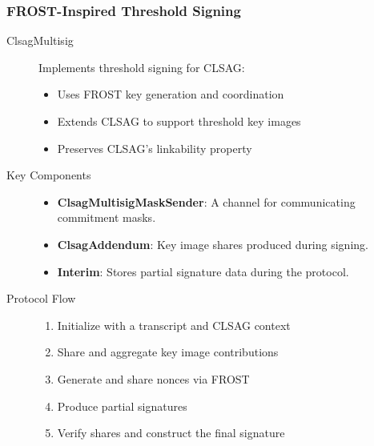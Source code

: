 \subsubsection{FROST-Inspired Threshold Signing}
\begin{description}
\item[ClsagMultisig] \hfill %

Implements threshold signing for CLSAG:
\begin{itemize}
\item Uses FROST key generation and coordination
\item Extends CLSAG to support threshold key images
\item Preserves CLSAG's linkability property
\end{itemize}

\item[Key Components] \hfill  %
\begin{itemize}
\item \textbf{ClsagMultisigMaskSender}: A channel for communicating commitment masks.  
\item \textbf{ClsagAddendum}: Key image shares produced during signing.  
\item \textbf{Interim}: Stores partial signature data during the protocol.  
\end{itemize}

\item[Protocol Flow] \hfill  %
\begin{enumerate}
\item Initialize with a transcript and CLSAG context
\item Share and aggregate key image contributions
\item Generate and share nonces via FROST
\item Produce partial signatures
\item Verify shares and construct the final signature
\end{enumerate}


\end{description}
